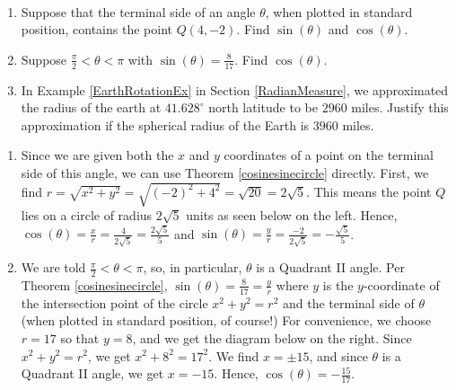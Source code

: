 \documentclass{ximera}
\begin{document}
\begin{example} \label{cosinesinecircleex}  $~$

\begin{enumerate}

\item  Suppose that the terminal side of an angle $\theta$, when plotted in standard position,  contains the point $Q(4,-2)$.  Find $\sin(\theta)$ and $\cos(\theta)$.

\item  Suppose $\frac{\pi}{2} < \theta < \pi$ with $\sin(\theta) = \frac{8}{17}$.  Find $\cos(\theta)$.

 \item In Example \ref{EarthRotationEx} in Section \ref{RadianMeasure}, we approximated the radius of the earth at  $41.628^{\circ}$ north latitude to be $2960$ miles. Justify this approximation if the spherical radius of the Earth is $3960$ miles.  

\end{enumerate}

\begin{explanation}

\begin{enumerate}

\item  Since we are given both the $x$ and $y$ coordinates of a point on the terminal side of this angle, we can use Theorem \ref{cosinesinecircle} directly. First, we find $r = \sqrt{x^2+y^2} = \sqrt{(-2)^2+4^2} = \sqrt{20} = 2\sqrt{5}$.  This means the point $Q$ lies on a circle of radius $2\sqrt{5}$ units as seen below on the left.  Hence, $\cos(\theta) = \frac{x}{r} =  \frac{4}{2 \sqrt{5}} = \frac{2 \sqrt{5}}{5}$ and $\sin(\theta) = \frac{y}{r} =  \frac{-2}{2 \sqrt{5}} = -\frac{\sqrt{5}}{5}$.

\item We are told $\frac{\pi}{2} < \theta < \pi$, so, in particular, $\theta$ is a Quadrant II angle.  Per Theorem \ref{cosinesinecircle}, $\sin(\theta) = \frac{8}{17} = \frac{y}{r}$ where $y$ is the $y$-coordinate of the intersection point of the circle $x^2+y^2 = r^2$ and the terminal side of $\theta$ (when plotted in standard position, of course!)  For convenience, we choose $r=17$ so that $y = 8$, and we get the diagram below on the right.  Since $x^2+y^2 = r^2$, we get $x^2 + 8^2 = 17^2$.  We find $x = \pm 15$, and since $\theta$ is a Quadrant II angle, we get $x = -15$.  Hence, $\cos(\theta) = -\frac{15}{17}$.


\begin{image}
\begin{tikzpicture}[
    >=Latex,
    every node/.style={font=\normalsize}
]


\end{tikzpicture}
\end{image}
\end{enumerate}
\end{explanation}
\end{example}
\end{document}
